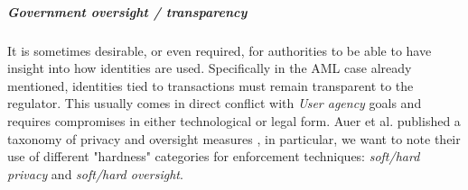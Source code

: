 \subparagraph{Government oversight / transparency} It is sometimes desirable, or even required, for authorities to be able to have insight into how identities are used. Specifically in the AML case already mentioned, identities tied to transactions must remain transparent to the regulator. This usually comes in direct conflict with \emph{User agency} goals and requires compromises in either technological or legal form. Auer et al. published a taxonomy of privacy and oversight measures \cite{ABCD25}, in particular, we want to note their use of different "hardness" categories for enforcement techniques: \emph{soft/hard privacy} and \emph{soft/hard oversight}.
